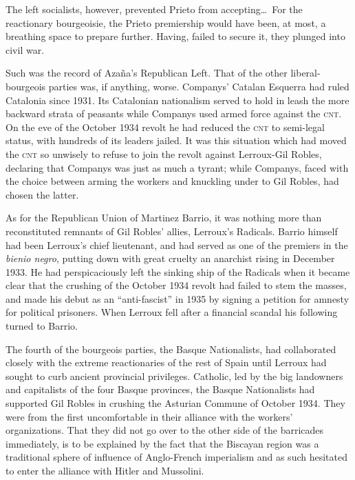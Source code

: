 The left socialists, however, prevented Prieto from accepting\ldots\ For the reactionary bourgeoisie, the Prieto premiership would have been, at most, a breathing space to prepare further. Having, failed to secure it, they plunged into civil war.

Such was the record of Azaña’s Republican Left. That of the other liberal-bourgeois parties was, if anything, worse. Companys’ Catalan Esquerra had ruled Catalonia since 1931. Its Catalonian nationalism served to hold in leash the more backward strata of peasants while Companys used armed force against the \textsc{cnt}. On the eve of the October 1934 revolt he had reduced the \textsc{cnt} to semi-legal status, with hundreds of its leaders jailed. It was this situation which had moved the \textsc{cnt} so unwisely to refuse to join the revolt against Lerroux-Gil Robles, declaring that Companys was just as much a tyrant; while Companys, faced with the choice between arming the workers and knuckling under to Gil Robles, had chosen the latter.

As for the Republican Union of Martinez Barrio, it was nothing more than reconstituted remnants of Gil Robles’ allies, Lerroux’s Radicals. Barrio himself had been Lerroux’s chief lieutenant, and had served as one of the premiers in the \emph{bienio negro}, putting down with great cruelty an anarchist rising in December 1933. He had perspicaciously left the sinking ship of the Radicals when it became clear that the crushing of the October 1934 revolt had failed to stem the masses, and made his debut as an ``anti-fascist'' in 1935 by signing a petition for amnesty for political prisoners. When Lerroux fell after a financial scandal his following turned to Barrio.

The fourth of the bourgeois parties, the Basque Nationalists, had collaborated closely with the extreme reactionaries of the rest of Spain until Lerroux had sought to curb ancient provincial privileges. Catholic, led by the big landowners and capitalists of the four Basque provinces, the Basque Nationalists had supported Gil Robles in crushing the Asturian Commune of October 1934. They were from the first uncomfortable in their alliance with the workers’ organizations. That they did not go over to the other side of the barricades immediately, is to be explained by the fact that the Biscayan region was a traditional sphere of influence of Anglo-French imperialism and as such hesitated to enter the alliance with Hitler and Mussolini.

